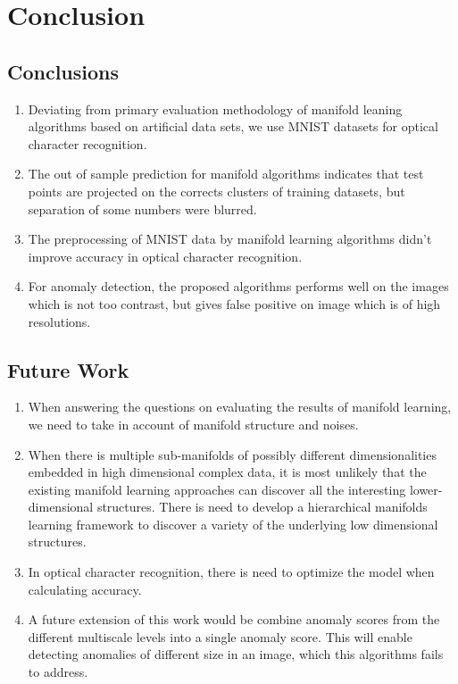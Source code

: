 \chapter{Conclusion} %

\label{Chapter6} %



\section{Conclusions}

\begin{enumerate}
\item Deviating from primary evaluation methodology of manifold leaning algorithms based on artificial data sets, we use MNIST datasets for optical character recognition.
\item The out of sample prediction for manifold algorithms indicates that test points are projected on the corrects clusters of training datasets, but separation of some numbers were blurred.
\item The preprocessing of MNIST data by manifold learning algorithms didn't improve accuracy in optical character recognition. 
\item For anomaly detection, the proposed algorithms performs well on the images which is not too contrast, but gives false positive on image which is of high resolutions.
\end{enumerate}

\section{Future Work}
\begin{enumerate}
\item When answering the questions on evaluating the results of manifold learning, we need to take in account of manifold structure and noises.
\item When there is multiple sub-manifolds of possibly different dimensionalities embedded in high dimensional complex data, it is most unlikely that the existing manifold learning approaches can discover all the interesting lower-dimensional structures. There is need to develop a hierarchical manifolds learning framework to discover a variety of the underlying low dimensional structures.
\item In optical character recognition, there is need to optimize the model when calculating accuracy. 
\item A future extension of this work would be combine  anomaly scores from the different multiscale levels into a single anomaly score. This will enable detecting anomalies of different size in an image, which this algorithms fails to address.
\end{enumerate}


